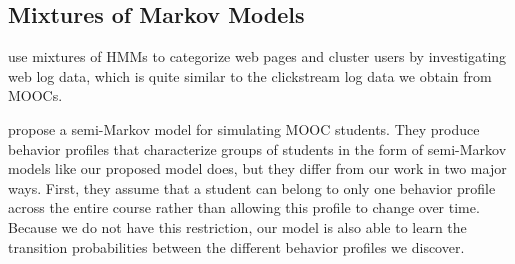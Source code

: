 \subsection{Mixtures of Markov Models}
\citet{Ypma:2002:Springer} use mixtures of HMMs to categorize web pages and
cluster users by investigating web log data, which is quite similar to the
clickstream log data we obtain from MOOCs.

\citet{Faucon:2016:EDM} propose a semi-Markov model for simulating MOOC
students. They produce behavior profiles that characterize groups of
students in the form of semi-Markov models like our proposed model does,
but they differ from our work in two major ways. First, they assume that a
student can belong to only one behavior profile across the entire course
rather than allowing this profile to change over time.  Because we do not
have this restriction, our model is also able to learn the transition
probabilities between the different behavior profiles we discover.
